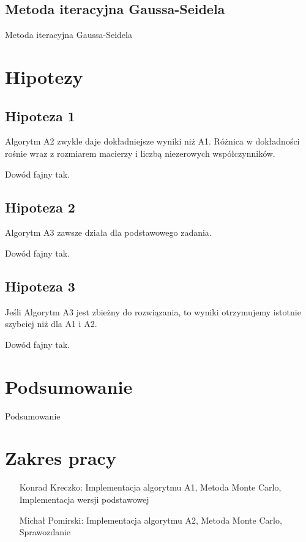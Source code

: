 \documentclass[titlepage]{article}
\begin{document}
\subsection{Metoda iteracyjna Gaussa-Seidela}
Metoda iteracyjna Gaussa-Seidela

\newpage

\section{Hipotezy}

\subsection{Hipoteza 1}
Algorytm A2 zwykle daje dokładniejsze wyniki niż A1. Różnica w dokładności rośnie wraz z rozmiarem macierzy i liczbą niezerowych współczynników.
\\
\par Dowód fajny tak.

\subsection{Hipoteza 2}
Algorytm A3 zawsze działa dla podstawowego zadania.
\\
\par Dowód fajny tak.

\subsection{Hipoteza 3}
Jeśli Algorytm A3 jest zbieżny do rozwiązania, to wyniki otrzymujemy istotnie szybciej niż dla A1 i A2.
\\
\par Dowód fajny tak.

\section{Podsumowanie}
Podsumowanie

\section{Zakres pracy}
\begin{itemize}[label=\textbullet, leftmargin=1.2in]
    \item[Konrad Kreczko:] Implementacja algorytmu A1, Metoda Monte Carlo, Implementacja wersji podstawowej
    \item[Michał Pomirski:] Implementacja algorytmu A2, Metoda Monte Carlo, Sprawozdanie
\end{itemize}
\end{document}
